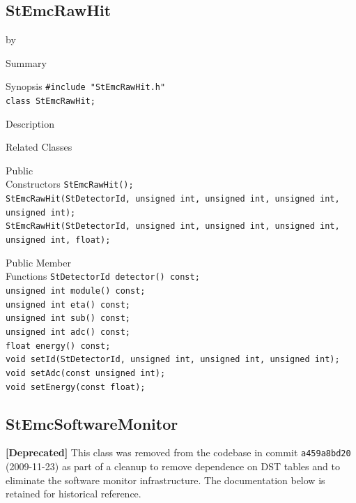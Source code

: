 \documentclass[twoside]{article}
\newcommand{\entrylabel}[1]{\mbox{\textbf{{#1}}}\hfil}%
\newenvironment{entry}
{\begin{list}{}%
    {\renewcommand{\makelabel}{\entrylabel}%
     \setlength{\labelwidth}{90pt}%
     \setlength{\leftmargin}{\labelwidth}
     \advance\leftmargin by \labelsep%
      }%
    }%
  {\end{list}}
\newcommand{\Entrylabel}[1]%
{\raisebox{0pt}[1ex][0pt]{\makebox[\labelwidth][l]%
    {\parbox[t]{\labelwidth}{\hspace{0pt}\textbf{{#1}}}}}}
\newenvironment{Entry}%
{\renewcommand{\entrylabel}{\Entrylabel}\begin{entry}}%
  {\end{entry}}
\begin{document}
\clearpage


\subsection{StEmcRawHit}
\label{sec:StEmcRawHit}
\begin{Entry}
\item[Summary]
\item[Synopsis]
    \verb+#include "StEmcRawHit.h"+\\
    \verb+class StEmcRawHit;+\\
\item[Description]
\item[Related Classes]
\item[Public\\ Constructors]
    \verb+StEmcRawHit();+\\
    \verb+StEmcRawHit(StDetectorId, unsigned int, unsigned int, unsigned int, unsigned int);+\\
    \verb+StEmcRawHit(StDetectorId, unsigned int, unsigned int, unsigned int, unsigned int, float);+\\
\item[Public Member\\ Functions]
    \verb+StDetectorId detector() const;+\\
    \verb+unsigned int module() const;+\\
    \verb+unsigned int eta() const;+\\
    \verb+unsigned int sub() const;+\\
    \verb+unsigned int adc() const;+\\
    \verb+float energy() const;+\\
    \verb+void setId(StDetectorId, unsigned int, unsigned int, unsigned int);+\\
    \verb+void setAdc(const unsigned int);+\\
    \verb+void setEnergy(const float);+\\
\end{Entry}
\clearpage


\subsection{StEmcSoftwareMonitor}
\label{sec:StEmcSoftwareMonitor}
\textbf{[Deprecated]} This class was removed from the codebase in commit
\texttt{a459a8bd20} (2009-11-23) as part of a cleanup to remove dependence on
DST tables and to eliminate the software monitor infrastructure.
The documentation below is retained for historical reference.
\end{document}
